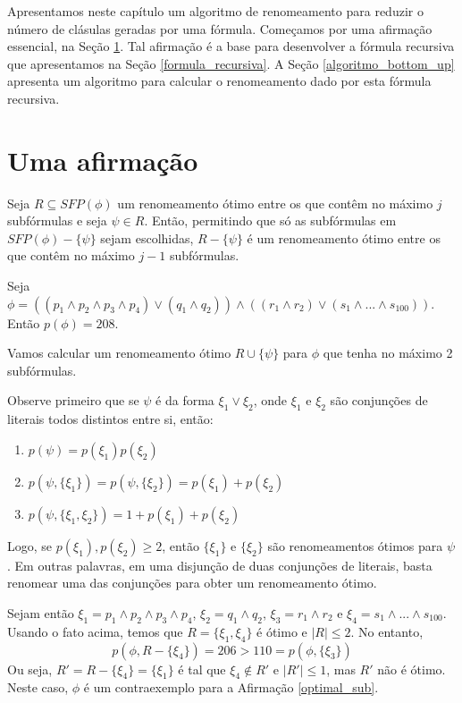 
\label{cap_algoritmo}

\indent

Apresentamos neste capítulo um algoritmo de renomeamento para reduzir o número de clásulas geradas por uma fórmula. Começamos por uma afirmação essencial, na Seção \ref{afirmacao}. Tal afirmação é a base para desenvolver a fórmula recursiva que apresentamos na Seção \ref{formula_recursiva}. A Seção \ref{algoritmo_bottom_up} apresenta um algoritmo para calcular o renomeamento dado por esta fórmula recursiva.

\section{Uma afirmação}
\label{afirmacao}

\begin{affirmation}
	\label{optimal_sub}
	Seja $R \subseteq SFP(\phi)$ um renomeamento ótimo entre os que contêm no máximo $j$ subfórmulas e seja $\psi \in R$. Então, permitindo que só as subfórmulas em $SFP(\phi) - \{\psi \}$ sejam escolhidas, $R - \{\psi\}$ é um renomeamento ótimo entre os que contêm no máximo $j-1$ subfórmulas.
\end{affirmation}

\begin{prova}
Seja $\phi = ((p_1 \wedge p_2 \wedge p_3 \wedge p_4) \vee (q_1 \wedge q_2)) \wedge ((r_1 \wedge r_2) \vee (s_1 \wedge ... \wedge s_{100}))$. Então $p(\phi) = 208$.

Vamos calcular um renomeamento ótimo $R \cup \{\psi \}$ para $\phi$ que tenha no máximo 2 subfórmulas.

Observe primeiro que se $\psi$ é da forma $\xi_1 \vee \xi_2$, onde $\xi_1$ e $\xi_2$ são conjunções de literais todos distintos entre si, então:
\begin{enumerate}
	\item $p(\psi) = p(\xi_1)p(\xi_2)$
	\item $p(\psi, \{\xi_1 \}) = p(\psi, \{\xi_2 \}) = p(\xi_1)+p(\xi_2)$
	\item $p(\psi,\{\xi_1,\xi_2 \}) = 1+p(\xi_1)+p(\xi_2)$
\end{enumerate}
Logo, se $p(\xi_1),p(\xi_2) \geq 2$, então $\{\xi_1 \}$ e $\{\xi_2 \}$ são renomeamentos ótimos para $\psi$. Em outras palavras, em uma disjunção de duas conjunções de literais, basta renomear uma das conjunções para obter um renomeamento ótimo.

Sejam então $\xi_1 = p_1 \wedge p_2 \wedge p_3 \wedge p_4$, $\xi_2 = q_1 \wedge q_2$, $\xi_3 = r_1 \wedge r_2$ e $\xi_4 = s_1 \wedge ... \wedge s_{100}$. Usando o fato acima, temos que $R = \{\xi_1,\xi_4 \}$ é ótimo e $|R| \leq 2$. No entanto, $$p(\phi,R - \{\xi_4 \}) = 206 > 110 = p(\phi,\{\xi_3 \})$$ Ou seja, $R' = R - \{\xi_4 \} = \{\xi_1 \}$ é tal que $\xi_4 \notin R'$ e $|R'| \leq 1$, mas $R'$ não é ótimo. Neste caso, $\phi$ é um contraexemplo para a Afirmação \ref{optimal_sub}.
\end{prova}

